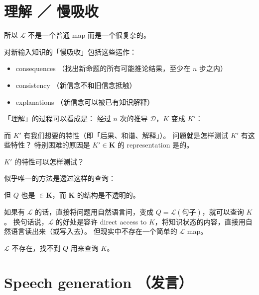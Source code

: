 \documentclass[12pt]{article}
\begin{document}
\section{理解 ／ 慢吸收}

所以 $\mathcal{L}$ 不是一个普通 map 而是一个很复杂的。

对新输入知识的「慢吸收」包括这些运作：
\begin{itemize}
\item consequences （找出新命题的所有可能推论结果，至少在 $n$ 步之内）
\item consistency （新信念不和旧信念抵触）
\item explanations （新信念可以被已有知识解释）
\end{itemize}

「理解」的过程可以看成是： 经过 $n$ 次的推导 $\mathcal{D}$，$K$ 变成 $K'$：
\begin{center}
\end{center}
而 $K'$ 有我们想要的特性（即「后果、和谐、解释」）。  问题就是怎样测试 $K'$ 有这些特性？  特别困难的原因是 $K' \in \mathbf{K}$ 的 representation 是的。

$K'$ 的特性可以怎样测试？

似乎唯一的方法是透过这样的查询：
\begin{center}
\end{center}
但 $Q$ 也是 $\in \mathbf{K}$，而 $\mathbf{K}$ 的结构是不透明的。

如果有 $\mathcal{L}$ 的话，直接将问题用自然语言问，变成 $Q = \mathcal{L}(\mbox{句子})$，就可以查询 $K$。 换句话说，$\mathcal{L}$ 的好处是容许 direct access to $K$，将知识状态的内容，直接用自然语言读出来（或写入去）。 但现实中不存在一个简单的 $\mathcal{L}$ map。

$\mathcal{L}$ 不存在，找不到 $Q$ 用来查询 $K$。 

\section{Speech generation （发言）}
\end{document}
